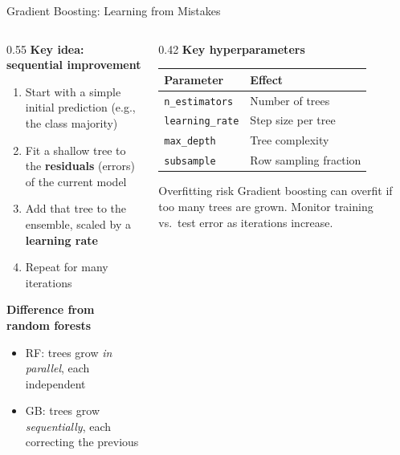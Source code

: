 \documentclass[aspectratio=169, 10pt]{beamer}
\begin{document}
\begin{frame}{Gradient Boosting: Learning from Mistakes}
\begin{columns}[T]
\begin{column}{0.55\textwidth}
\textbf{Key idea: sequential improvement}
\begin{enumerate}
  \setlength\itemsep{0.35em}
  \item Start with a simple initial prediction (e.g., the class majority)
  \item Fit a shallow tree to the \textbf{residuals} (errors) of the current model
  \item Add that tree to the ensemble, scaled by a \textbf{learning rate}
  \item Repeat for many iterations
\end{enumerate}

\vspace{0.5em}
\textbf{Difference from random forests}
\begin{itemize}
  \item RF: trees grow \textit{in parallel}, each independent
  \item GB: trees grow \textit{sequentially}, each correcting the previous
\end{itemize}
\end{column}
\begin{column}{0.42\textwidth}
\textbf{Key hyperparameters}
\vspace{0.4em}

\small
\renewcommand{\arraystretch}{1.3}
\begin{tabular}{ll}
\toprule
Parameter & Effect \\
\midrule
\texttt{n\_estimators}  & Number of trees \\
\texttt{learning\_rate} & Step size per tree \\
\texttt{max\_depth}     & Tree complexity \\
\texttt{subsample}      & Row sampling fraction \\
\bottomrule
\end{tabular}

\vspace{0.8em}
\begin{alertblock}{Overfitting risk}
Gradient boosting can overfit if too many trees are grown. Monitor training vs.\ test error as iterations increase.
\end{alertblock}
\end{column}
\end{columns}
\end{frame}
\end{document}
